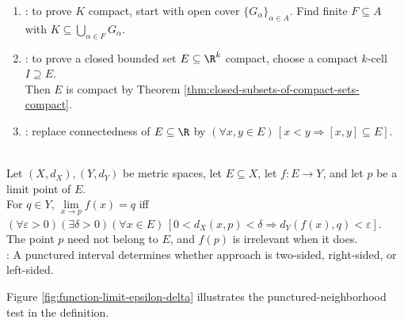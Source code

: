\begin{method} \label{meth:compact-connected-proof-patterns} 
\begin{enumerate}[label=(\roman*)]
\setlength{\itemsep}{0pt}
\item {}: to prove $K$ compact, start with open cover $\{G_\alpha\}_{\alpha\in A}$. Find finite $F\subseteq A$ with $K\subseteq\bigcup\limits_{\alpha\in F}G_\alpha$.
\item {}: to prove a closed bounded set $E\subseteq\R^k$ compact, choose a compact $k$-cell $I\supseteq E$.\\
Then $E$ is compact by Theorem \ref{thm:closed-subsets-of-compact-sets-compact}.
\item {}: replace connectedness of $E\subseteq\R$ by $(\forall x,y\in E)\,[x<y\Longrightarrow[x,y]\subseteq E]$.
\end{enumerate}
\end{method}

\begin{definition} \label{def:function-limit-metric} \\
Let $(X,d_X),(Y,d_Y)$ be metric spaces, let $E\subseteq X$, let $f:E\to Y$, and let $p$ be a limit point of $E$.\\
For $q\in Y$, $\lim\limits_{x\to p}f(x)=q$ iff $(\forall\varepsilon>0)(\exists\delta>0)(\forall x\in E)\,[0<d_X(x,p)<\delta\Longrightarrow d_Y(f(x),q)<\varepsilon]$.\\
The point $p$ need not belong to $E$, and $f(p)$ is irrelevant when it does.\\
: A punctured interval determines whether approach is two-sided, right-sided, or left-sided.
\end{definition}

Figure \ref{fig:function-limit-epsilon-delta} illustrates the punctured-neighborhood test in the definition.
\begin{illustrationfigure}[H]
  \centering
  
  \caption{The epsilon--delta geometry for \(\lim\limits_{x\to p} f(x)=q\).}
  \label{fig:function-limit-epsilon-delta}
\end{illustrationfigure}


